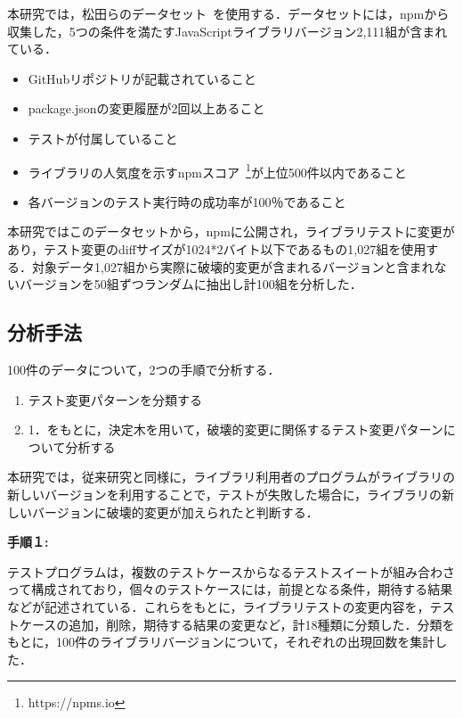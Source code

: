 \documentclass[uplatex,dvipdfmx,a4paper,twocolumn,base=11pt,jbase=11pt,ja=standard]{bxjsarticle}  %
\begin{document}
本研究では，松田らのデータセット~\cite{FOSE2021_Matsuda}を使用する．データセットには，npmから収集した，5つの条件を満たすJavaScriptライブラリバージョン2,111組が含まれている．
\vspace{-2mm}
\begin{itemize}
 \item GitHubリポジトリが記載されていること
 \item package.jsonの変更履歴が2回以上あること
 \item テストが付属していること
 \item ライブラリの人気度を示すnpmスコア~\footnote{https://npms.io}が上位500件以内であること
 \item 各バージョンのテスト実行時の成功率が100％であること
\end{itemize}

本研究ではこのデータセットから，npmに公開され，ライブラリテストに変更があり，テスト変更のdiffサイズが1024*2バイト以下であるもの1,027組を使用する．対象データ1,027組から実際に破壊的変更が含まれるバージョンと含まれないバージョンを50組ずつランダムに抽出し計100組を分析した．

\subsection{分析手法}

100件のデータについて，2つの手順で分析する．
\vspace{-2mm}
\begin{enumerate}
 \item テスト変更パターンを分類する
 \item 1．をもとに，決定木を用いて，破壊的変更に関係するテスト変更パターンについて分析する
\end{enumerate}

本研究では，従来研究と同様に，ライブラリ利用者のプログラムがライブラリの新しいバージョンを利用することで，テストが失敗した場合に，ライブラリの新しいバージョンに破壊的変更が加えられたと判断する．

\noindent\textbf{手順１: }

テストプログラムは，複数のテストケースからなるテストスイートが組み合わさって構成されており，個々のテストケースには，前提となる条件，期待する結果などが記述されている．これらをもとに，ライブラリテストの変更内容を，テストケースの追加，削除，期待する結果の変更など，計18種類に分類した．分類をもとに，100件のライブラリバージョンについて，それぞれの出現回数を集計した．
\end{document}
